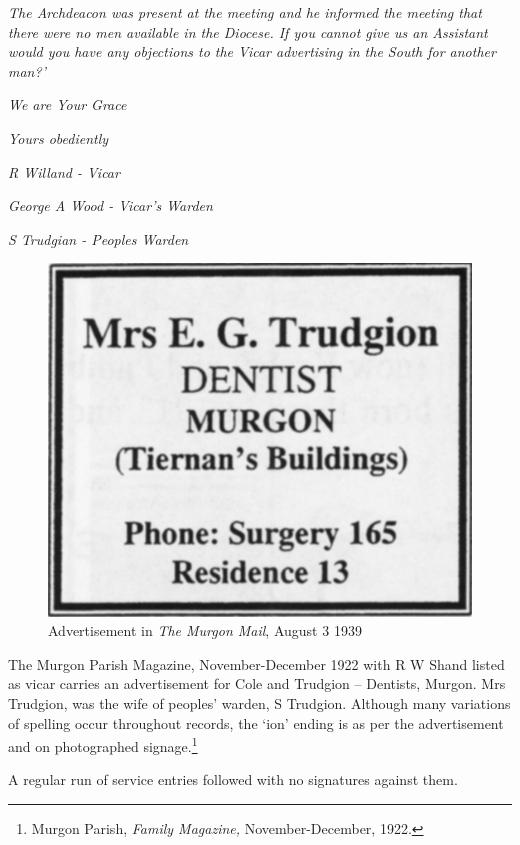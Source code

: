 \emph{The Archdeacon was present at the meeting and he informed the meeting that there were no men available in the Diocese. If you cannot give us an Assistant would you have any objections to the Vicar advertising in the South for another man?'}



\emph{We are Your Grace}



\emph{Yours obediently}



\emph{R Willand - Vicar}



\emph{George A Wood - Vicar's Warden}



\emph{S Trudgian - Peoples Warden}



\medskip








\begin{figure}
\begin{center}
\includegraphics[width=.5\linewidth,center]{../images/trudgionAd.jpg}
\caption{Advertisement in \emph{The Murgon Mail}, August 3 1939}
\end{center}
\end{figure}




The Murgon Parish Magazine, November-December 1922 with R W Shand listed as vicar carries an advertisement for Cole and Trudgion -- Dentists, Murgon. Mrs Trudgion, was the wife of peoples' warden, S Trudgion. Although many variations of spelling occur throughout records, the `ion' ending is as per the advertisement and on photographed signage.\footnote{Murgon Parish, \emph{Family Magazine,} November-December, 1922.}


A regular run of service entries followed with no signatures against them.



